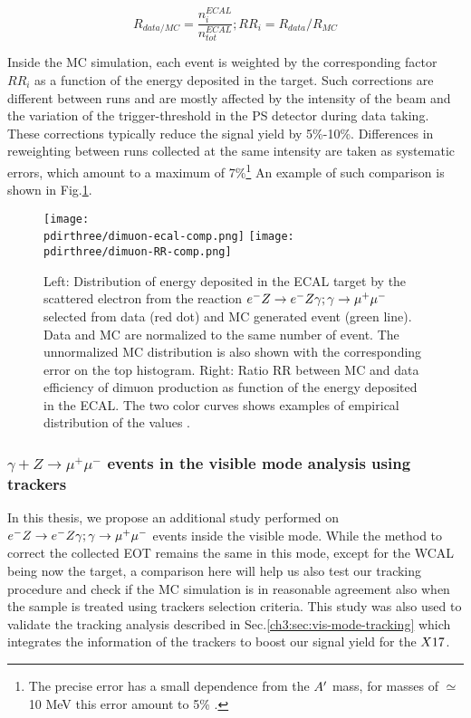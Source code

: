 \begin{equation}
  \label{eq:RR-factor}
  R_{data/MC} = \frac{n_i^{ECAL}}{n_{tot}^{ECAL}}; RR_i = R_{data}/R_{MC}
\end{equation}

Inside the MC simulation, each event is weighted by the corresponding factor $RR_i$ as a function of the energy deposited in the target. Such corrections are different between runs and are mostly affected by the intensity of the beam and the variation of the trigger-threshold in the PS detector during data taking. These corrections typically reduce the signal yield by 5\%-10\%. Differences in reweighting between runs collected at the same intensity are taken as systematic errors, which amount to a maximum of 7\%\footnote{The precise error has a small dependence from the $A'$ mass, for masses of $\simeq$10 MeV this error amount to 5\% \cite{na64-prd}.} An example of such comparison is shown in Fig.\ref{fig:dimuon-comp-invis}.

\begin{figure}[tbh!]
  \centering
  \texttt{[image: \\pdirthree/dimuon-ecal-comp.png]}
  \texttt{[image: \\pdirthree/dimuon-RR-comp.png]}
  \caption[Dimuon spectra in ECAL for data and MC.]{Left: Distribution of energy deposited in the ECAL target by the scattered electron from the reaction $e^- Z \to e^- Z \gamma; \gamma \to \mu^+ \mu^-$ selected from data (red dot) and MC generated event (green line). Data and MC are normalized to the same number of event. The unnormalized MC distribution is also shown with the corresponding error on the top histogram. Right: Ratio RR between MC and data efficiency of dimuon production as function of the energy deposited in the ECAL. The two color curves shows examples of empirical distribution of the values \cite{na64-prd}.}
  \label{fig:dimuon-comp-invis}
\end{figure}

\subsubsection{$\gamma + Z \rightarrow \mu^+ \mu^-$ events in the visible mode analysis using trackers}

In this thesis, we propose an additional study performed on $e^- Z \to e^- Z \gamma; \gamma \to \mu^+ \mu^-$ events inside the visible mode. While the method to correct the collected EOT remains the same in this mode, except for the WCAL being now the target, a comparison here will help us also test our tracking procedure and check if the MC simulation is in reasonable agreement also when the sample is treated using trackers selection criteria. This study was also used to validate the tracking analysis described in Sec.\ref{ch3:sec:vis-mode-tracking} which integrates the information of the trackers to boost our signal yield for the $X17$.

